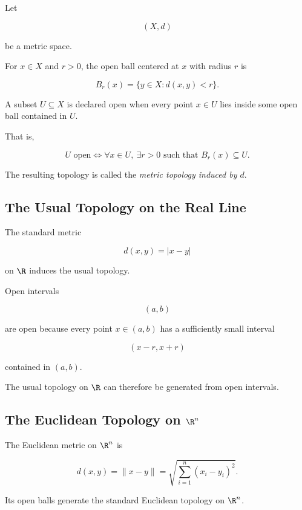 Let

\[
(X,d)
\]

be a metric space.

For \(x\in X\) and \(r>0\), the open ball centered at \(x\) with radius
\(r\) is

\[
\boxed{
B_r(x)
=
\{y\in X:d(x,y)<r\}.
}
\]

A subset \(U\subseteq X\) is declared open when every point \(x\in U\)
lies inside some open ball contained in \(U\).

That is,

\[
\boxed{
U\text{ open}
\iff
\forall x\in U,\ 
\exists r>0
\text{ such that }
B_r(x)\subseteq U.
}
\]

The resulting topology is called the \emph{metric topology induced by \(d\)}.

\subsection{The Usual Topology on the Real Line}
\label{subsec:usual-topology-real-line}

The standard metric

\[
d(x,y)=|x-y|
\]

on \(\R\) induces the usual topology.

Open intervals

\[
(a,b)
\]

are open because every point \(x\in(a,b)\) has a sufficiently small interval

\[
(x-r,x+r)
\]

contained in \((a,b)\).

The usual topology on \(\R\) can therefore be generated from open intervals.

\subsection{The Euclidean Topology on \texorpdfstring{\(\R^n\)}{R^n}}
\label{subsec:euclidean-topology-rn}

The Euclidean metric on \(\R^n\) is

\[
\boxed{
d(x,y)
=
\|x-y\|
=
\sqrt{
\sum_{i=1}^{n}(x_i-y_i)^2
}.
}
\]

Its open balls generate the standard Euclidean topology on \(\R^n\).

